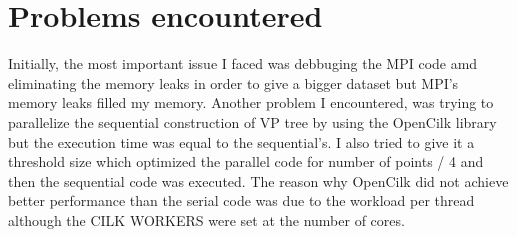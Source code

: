 \documentclass[12pt, a4paper]{report}
\begin{document}
\vspace{5mm} %

\section*{Problems encountered}
Initially, the most important issue I faced was debbuging the MPI code amd eliminating the memory leaks in order to give a 
bigger dataset but MPI's memory leaks filled my memory. Another problem I encountered, was trying to parallelize the sequential construction
of VP tree by using the OpenCilk library but the execution time was equal to the sequential's. I also tried to give it a threshold size 
which optimized the parallel code for number of points / 4 and then the sequential code was executed. The reason why OpenCilk did not achieve
better performance than the serial code was due to the workload per thread although the CILK WORKERS were set at the number of cores.    
\end{document}
